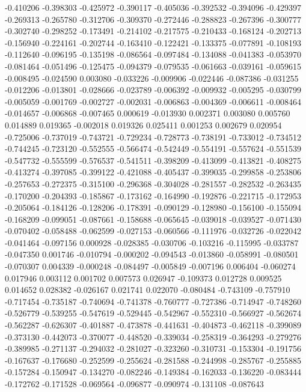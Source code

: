 -0.410206
-0.398303
-0.425972
-0.390117
-0.405036
-0.392532
-0.394096
-0.429397
-0.269313
-0.265780
-0.312706
-0.309370
-0.272446
-0.288823
-0.267396
-0.300777
-0.302740
-0.298252
-0.173491
-0.214102
-0.217575
-0.210433
-0.168124
-0.202713
-0.156940
-0.224161
-0.202744
-0.163410
-0.122421
-0.133375
-0.077891
-0.108193
-0.112640
-0.096195
-0.135198
-0.086564
-0.097484
-0.134088
-0.041383
-0.053970
-0.081464
-0.051496
-0.125475
-0.094379
-0.079535
-0.061663
-0.039161
-0.059615
-0.008495
-0.024590
0.003080
-0.033226
-0.009906
-0.022446
-0.087386
-0.031255
-0.012206
-0.013801
-0.028666
-0.023789
-0.006392
-0.009932
-0.005295
-0.030799
-0.005059
-0.001769
-0.002727
-0.002031
-0.006863
-0.004369
-0.006611
-0.008464
-0.014657
-0.006868
-0.007465
0.000619
-0.013930
0.002371
0.003080
0.005760
0.014889
0.019365
-0.002018
0.019326
0.025411
0.001253
0.002679
0.020954
-0.725006
-0.737019
-0.743721
-0.729234
-0.728773
-0.738191
-0.733012
-0.734512
-0.744245
-0.723120
-0.552555
-0.566474
-0.542449
-0.554191
-0.557624
-0.551539
-0.547732
-0.555599
-0.576537
-0.541511
-0.398209
-0.413099
-0.413821
-0.408275
-0.413274
-0.397085
-0.399122
-0.421088
-0.405437
-0.399035
-0.299858
-0.253806
-0.257653
-0.272375
-0.315100
-0.296368
-0.304028
-0.281557
-0.282532
-0.263435
-0.170200
-0.204393
-0.185867
-0.173162
-0.164990
-0.192876
-0.221715
-0.172953
-0.205064
-0.184126
-0.128206
-0.178391
-0.090129
-0.128980
-0.156100
-0.155094
-0.168209
-0.099051
-0.087661
-0.158688
-0.065645
-0.039018
-0.039527
-0.071430
-0.070402
-0.058488
-0.062599
-0.027153
-0.060566
-0.111976
-0.032726
-0.022042
-0.041464
-0.097156
0.000928
-0.028385
-0.030706
-0.103216
-0.115995
-0.033787
-0.047350
0.001746
-0.010794
-0.000202
-0.094543
-0.013860
-0.058991
-0.080501
-0.070307
0.004339
-0.000248
-0.084497
-0.005849
-0.007196
0.006404
-0.060274
0.017946
0.003112
0.001702
0.007573
0.026947
-0.109373
0.012728
0.009525
0.014652
0.028382
-0.026167
0.021741
0.022070
-0.080484
-0.743109
-0.757910
-0.717454
-0.735187
-0.740694
-0.741378
-0.760777
-0.727386
-0.714947
-0.748260
-0.526779
-0.539255
-0.547619
-0.529445
-0.542967
-0.552310
-0.566927
-0.562674
-0.562287
-0.626307
-0.401887
-0.473878
-0.441631
-0.404873
-0.462118
-0.399089
-0.373130
-0.442073
-0.370077
-0.448520
-0.339034
-0.258319
-0.364293
-0.279276
-0.389985
-0.271137
-0.294032
-0.281027
-0.323260
-0.310731
-0.153304
-0.191756
-0.167637
-0.176680
-0.252599
-0.255624
-0.281588
-0.244998
-0.285767
-0.255885
-0.157284
-0.150947
-0.134270
-0.082246
-0.149384
-0.162033
-0.136220
-0.083444
-0.172762
-0.171528
-0.069564
-0.096877
-0.090974
-0.131108
-0.087643
